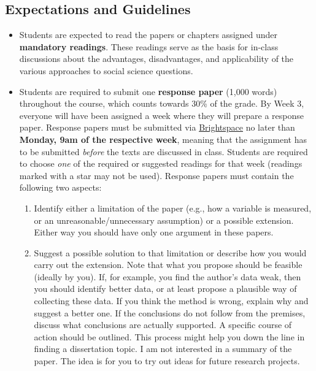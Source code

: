 \documentclass[abstract=on,parskip=full,headings=standardclasses,fontsize=11pt,paper=a4]{scrartcl}
\begin{document}
\subsection*{Expectations and Guidelines}
\begin{itemize}


\item Students are expected to read the papers or chapters assigned under \textbf{mandatory readings}. These readings serve as the basis for in-class discussions about the advantages, disadvantages, and applicability of the various approaches to social science questions. 

\item Students are required to submit one \textbf{response paper} (1,000 words) throughout the course, which counts towards 30\% of the grade. By Week 3, everyone will have been assigned a week where they will prepare a response paper. Response papers must be submitted via \href{https://brightspace.ucd.ie/d2l/home}{Brightspace} no later than \textbf{Monday, 9am of the respective week}, meaning that the assignment has to be submitted \textit{before} the texts are discussed in class. Students are required to choose \textit{one} of the required or suggested readings for that week (readings marked with a star may not be used).  Response papers must contain the following two aspects:
\begin{enumerate}
\item Identify either a limitation of the paper (e.g., how a variable is measured, or an unreasonable/unnecessary assumption) or a possible extension. Either way you should have only one argument in these papers. 
\item Suggest a possible solution to that limitation or describe how you would carry out the extension. Note that what you propose should be feasible (ideally by you). If, for example, you find the author's data weak, then you should identify better data, or at least propose a plausible way of collecting these data. If you think the method is wrong, explain why and suggest a better one. If the conclusions do not follow from the premises, discuss what conclusions are actually supported. A specific course of action should be outlined. This process might help you down the line in finding a dissertation topic.
I am not interested in a summary of the paper. The idea is for you to try out ideas for future research projects. 
\end{enumerate}



\end{itemize}
\end{document}
